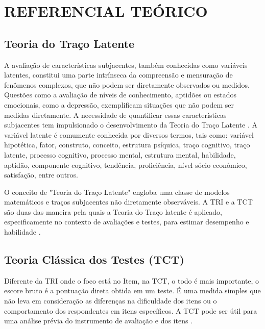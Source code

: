 \chapter{REFERENCIAL TEÓRICO}

\section{Teoria do Traço Latente}


 A avaliação de características subjacentes, também conhecidas como variáveis latentes, constitui uma parte intrínseca da compreensão e mensuração de fenômenos complexos, que não podem ser diretamente observados ou medidos. Questões como a avaliação de níveis de conhecimento, aptidões ou estados emocionais, como a depressão, exemplificam situações que não podem ser medidas diretamente. A necessidade de quantificar essas características subjacentes tem impulsionado o desenvolvimento da Teoria do Traço Latente \cite{pasquali2003fundamentos}. A variável latente é comumente conhecida por diversos termos, tais como: variável hipotética, fator, construto, conceito, estrutura psíquica, traço cognitivo, traço latente, processo cognitivo, processo mental, estrutura mental, habilidade, aptidão, componente cognitivo, tendência, proficiência, nível sócio econômico, satisfação, entre outros.

O conceito de "Teoria do Traço Latente" engloba uma classe de modelos matemáticos e traços subjacentes não diretamente observáveis. A TRI e a TCT são duas das maneira pela quais a Teoria do Traço latente é aplicado, especificamente no contexto de avaliações e testes, para estimar desempenho e habilidade \cite{pasquali2018}.

\section{Teoria Clássica dos Testes (TCT)}

Diferente da TRI onde o foco está no Item, na TCT, o todo é mais importante, o escore bruto é a pontuação direta obtida em um teste. É uma medida simples que não leva em consideração as diferenças na dificuldade dos itens ou o comportamento dos respondentes em itens específicos. A TCT pode ser útil para uma análise prévia do instrumento de avaliação e dos itens \cite{pasquali1996}.


\begin{comment}
	Na TCT a dificuldade do Item é calculado a partir da proporção de sujeitos que respondem corretamente tal item. O escore bruto é calculado somando-se o número de respostas corretas.
	
 Neste trabalho, são aplicados alguns procedimentos da Teoria Clássica dos Testes, incluindo a análise da Correlação Ponto-Bisserial e do Coeficiente Alfa de Cronbach.
\end{comment}

